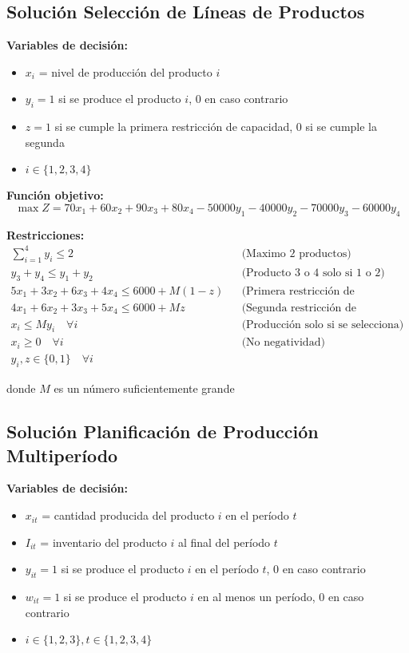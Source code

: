 \documentclass[12pt]{article}
\begin{document}
\subsection{Solución Selección de Líneas de Productos}

\textbf{Variables de decisión:}
\begin{itemize}
    \item $x_i$ = nivel de producción del producto $i$
    \item $y_i = 1$ si se produce el producto $i$, 0 en caso contrario
    \item $z = 1$ si se cumple la primera restricción de capacidad, 0 si se cumple la segunda
    \item $i \in \{1, 2, 3, 4\}$
\end{itemize}

\textbf{Función objetivo:}
$$\max Z = 70x_1 + 60x_2 + 90x_3 + 80x_4 - 50000y_1 - 40000y_2 - 70000y_3 - 60000y_4$$

\textbf{Restricciones:}
\begin{align*}
    \sum_{i=1}^{4} y_i \leq 2 && \text{(Maximo 2 productos)} \\
    y_3 + y_4 \leq y_1 + y_2 && \text{(Producto 3 o 4 solo si 1 o 2)} \\
    5x_1 + 3x_2 + 6x_3 + 4x_4 \leq 6000 + M(1-z) && \text{(Primera restricción de capacidad)} \\
    4x_1 + 6x_2 + 3x_3 + 5x_4 \leq 6000 + Mz && \text{(Segunda restricción de capacidad)} \\
    x_i \leq My_i \quad \forall i && \text{(Producción solo si se selecciona)} \\
    x_i \geq 0 \quad \forall i && \text{(No negatividad)} \\
    y_i, z \in \{0,1\} \quad \forall i
\end{align*}
\begin{center}
donde $M$ es un número suficientemente grande
\end{center}

\subsection{Solución Planificación de Producción Multiperíodo}

\textbf{Variables de decisión:}
\begin{itemize}
    \item $x_{it}$ = cantidad producida del producto $i$ en el período $t$
    \item $I_{it}$ = inventario del producto $i$ al final del período $t$
    \item $y_{it} = 1$ si se produce el producto $i$ en el período $t$, 0 en caso contrario
    \item $w_{it} = 1$ si se produce el producto $i$ en al menos un período, 0 en caso contrario
    \item $i \in \{1, 2, 3\}, t \in \{1, 2, 3, 4\}$
\end{itemize}
\end{document}

